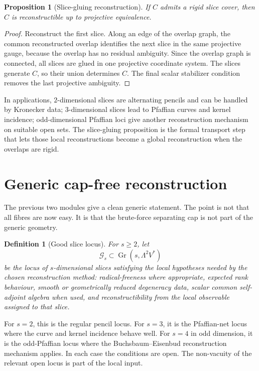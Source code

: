 \documentclass[11pt]{article}
\newtheorem{proposition}[theorem]{Proposition}
\newtheorem{definition}[theorem]{Definition}
\begin{document}
\begin{proposition}[Slice-gluing reconstruction]
If $C$ admits a rigid slice cover, then $C$ is reconstructible up to projective equivalence.
\end{proposition}

\begin{proof}
Reconstruct the first slice. Along an edge of the overlap graph, the common reconstructed overlap identifies the next slice in the same projective gauge, because the overlap has no residual ambiguity. Since the overlap graph is connected, all slices are glued in one projective coordinate system. The slices generate $C$, so their union determines $C$. The final scalar stabilizer condition removes the last projective ambiguity.
\end{proof}

In applications, $2$-dimensional slices are alternating pencils and can be handled by Kronecker data; $3$-dimensional slices lead to Pfaffian curves and kernel incidence; odd-dimensional Pfaffian loci give another reconstruction mechanism on suitable open sets. The slice-gluing proposition is the formal transport step that lets those local reconstructions become a global reconstruction when the overlaps are rigid.

\section{Generic cap-free reconstruction}

The previous two modules give a clean generic statement. The point is not that all fibres are now easy. It is that the brute-force separating cap is not part of the generic geometry.

\begin{definition}[Good slice locus]
For $s\ge2$, let
\[
\mathcal G_s\subset\operatorname{Gr}(s,\Lambda^2V^*)
\]
be the locus of $s$-dimensional slices satisfying the local hypotheses needed by the chosen reconstruction method: radical-freeness where appropriate, expected rank behaviour, smooth or geometrically reduced degeneracy data, scalar common self-adjoint algebra when used, and reconstructibility from the local observable assigned to that slice.
\end{definition}

For $s=2$, this is the regular pencil locus. For $s=3$, it is the Pfaffian-net locus where the curve and kernel incidence behave well. For $s=4$ in odd dimension, it is the odd-Pfaffian locus where the Buchsbaum--Eisenbud reconstruction mechanism applies. In each case the conditions are open. The non-vacuity of the relevant open locus is part of the local input.
\end{document}
